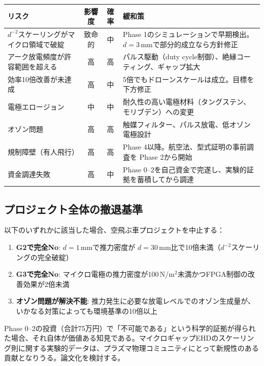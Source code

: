 \documentclass[12pt,a4paper]{ltjsarticle}
\begin{document}
\begin{center}
\sffamily\small
\begin{tabular}{@{}p{4cm}ccp{5cm}@{}}
\toprule
\textbf{リスク} & \textbf{影響度} & \textbf{確率} & \textbf{緩和策} \\
\midrule
$d^{-2}$スケーリングがマイクロ領域で破綻 & 致命的 & 中 & Phase 1のシミュレーションで早期検出。$d = 3$\,mmで部分的成立なら方針修正 \\[6pt]
アーク放電頻度が許容範囲を超える & 高 & 高 & パルス駆動（duty cycle制御）、絶縁コーティング、ギャップ拡大 \\[6pt]
効率10倍改善が未達成 & 高 & 中 & 5倍でもドローンスケールは成立。目標を下方修正 \\[6pt]
電極エロージョン & 中 & 中 & 耐久性の高い電極材料（タングステン、モリブデン）への変更 \\[6pt]
オゾン問題 & 高 & 高 & 触媒フィルター、パルス放電、低オゾン電極設計 \\[6pt]
規制障壁（有人飛行） & 高 & 高 & Phase 4以降。航空法、型式証明の事前調査を Phase 2から開始 \\[6pt]
資金調達失敗 & 高 & 中 & Phase 0--2を自己資金で完遂し、実験的証拠を蓄積してから調達 \\
\bottomrule
\end{tabular}
\end{center}

\subsection{プロジェクト全体の撤退基準}

以下のいずれかに該当した場合、空飛ぶ車プロジェクトを中止する：

\begin{warningbox}[撤退基準]
\begin{enumerate}[leftmargin=2em]
  \item \textbf{G2で完全No}: $d = 1$\,mmで推力密度が $d = 30$\,mm比で10倍未満（$d^{-2}$スケーリングの完全破綻）
  \item \textbf{G3で完全No}: マイクロ電極の推力密度が100\,N/m$^2$未満かつFPGA制御の改善効果が2倍未満
  \item \textbf{オゾン問題が解決不能}: 推力発生に必要な放電レベルでのオゾン生成量が、いかなる対策によっても環境基準の10倍以上
\end{enumerate}
\end{warningbox}

\begin{infobox}[撤退は失敗ではない]
Phase 0--2の投資（合計75万円）で「不可能である」という科学的証拠が得られた場合、それ自体が価値ある知見である。マイクロギャップEHDのスケーリング則に関する実験的データは、プラズマ物理コミュニティにとって新規性のある貢献となりうる。論文化を検討する。
\end{infobox}
\end{document}
